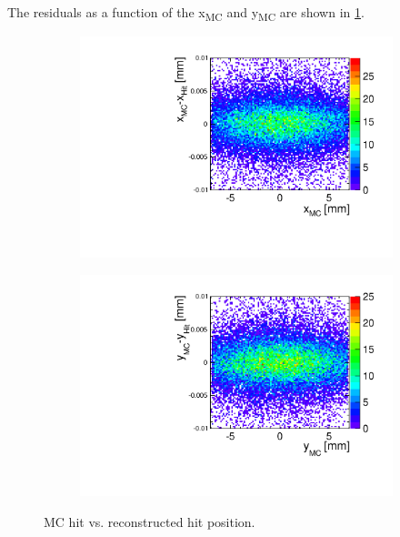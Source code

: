 The residuals as a function of the x\textsubscript{MC} and
y\textsubscript{MC} are shown in \cref{fig:TelPlane0_MC_hit_2D}.

\begin{figure}[htbp] \centering
  \begin{subfigure}[b]{0.45\textwidth}
    \includegraphics[width=\textwidth]{figures/Telescope/telescopePlane0_MC_vs_hit_x_2D.pdf}
    \caption{}
  \end{subfigure}\hfill
  \begin{subfigure}[b]{0.45\textwidth}
    \includegraphics[width=\textwidth]{figures/Telescope/telescopePlane0_MC_vs_hit_y_2D.pdf}
    \caption{}
  \end{subfigure}
  \caption{MC hit vs. reconstructed hit position.}
  \label{fig:TelPlane0_MC_hit_2D}
\end{figure}


